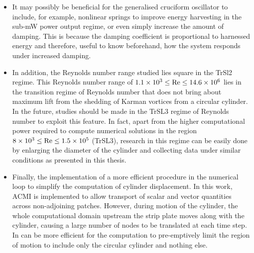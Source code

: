 \documentclass[oneside]{utmthesis}
\begin{document}
\begin{itemize}
 \item It may possibly be beneficial for the generalised cruciform oscillator to include, for example, nonlinear springs to improve energy harvesting in the sub-mW power output regime, or even simply increase the amount of damping. This is because the damping coefficient is proportional to harnessed energy and therefore, useful to know beforehand, how the system responds under increased damping.

\item In addition, the Reynolds number range studied lies square in the TrSl2 regime. This Reynolds number range of $1.1 \times 10^{3} \leq \text{Re} \leq 14.6 \times 10^{6}$ lies in the transition regime of Reynolds number that does not bring about maximum lift from the shedding of Karman vortices from a circular cylinder. In the future, studies should be made in the TrSL3 regime of Reynolds number to exploit this feature. In fact, apart from the higher computational power required to compute numerical solutions in the region $8 \times 10^{3} \leq \text{Re} \leq 1.5 \times 10^{5}$ (TrSL3), research in this regime can be easily done by enlarging the diameter of the cylinder and collecting data under similar conditions as presented in this thesis.

\item Finally, the implementation of a more efficient procedure in the numerical loop to simplify the computation of cylinder displacement. In this work, ACMI is implemented to allow transport of scalar and vector quantities across non-adjoining patches. However, during motion of the cylinder, the whole computational domain upstream the strip plate moves along with the cylinder, causing a large number of nodes to be translated at each time step. In can be more efficient for the computation to pre-emptively limit the region of motion to include only the circular cylinder and nothing else.
\end{itemize}

%


\appendix
\end{document}

